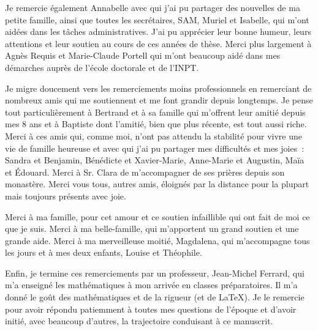 \begin{fullwidth}
    Je remercie également Annabelle avec qui j'ai pu partager des nouvelles de ma petite famille, ainsi que toutes les secrétaires, SAM, Muriel et Isabelle, qui m'ont aidées dans les tâches administratives. J'ai pu apprécier leur bonne humeur, leurs attentions et leur soutien au cours de ces années de thèse. Merci plus largement à Agnès Requis et Marie-Claude Portell qui m'ont beaucoup aidé dans mes démarches auprès de l'école doctorale et de l'INPT. 
    
    Je migre doucement vers les remerciements moins professionnels en remerciant de nombreux amis qui me soutiennent et me font grandir depuis longtemps. Je pense tout particulièrement à Bertrand et à sa famille qui m'offrent leur amitié depuis mes 8 ans et à Baptiste dont l'amitié, bien que plus récente, est tout aussi riche. Merci à ces amis qui, comme moi, n'ont pas attendu la stabilité pour vivre une vie de famille heureuse et avec qui j'ai pu partager mes difficultés et mes joies~: Sandra et Benjamin, Bénédicte et Xavier-Marie, Anne-Marie et Augustin, Maïa et \'Edouard. Merci à Sr. Clara de m'accompagner de ses prières depuis son monastère. Merci vous tous, autres amis, éloignés par la distance pour la plupart mais toujours présents avec joie.
    
    Merci à ma famille, pour cet amour et ce soutien infaillible qui ont fait de moi ce que je suis. Merci à ma belle-famille, qui m'apportent un grand soutien et une grande aide. Merci à ma merveilleuse moitié, Magdalena, qui m'accompagne tous les jours et à mes deux enfants, Louise et Théophile.
    
    Enfin, je termine ces remerciements par un professeur, Jean-Michel Ferrard, qui m'a enseigné les mathématiques à mon arrivée en classes préparatoires. Il m'a donné le goût des mathématiques et de la rigueur (et de \LaTeX). Je le remercie pour avoir répondu patiemment à toutes mes questions de l'époque et d'avoir initié, avec beaucoup d'autres, la trajectoire conduisant à ce manuscrit. 
    
    \newpage\thispagestyle{empty}
    
\end{fullwidth}

